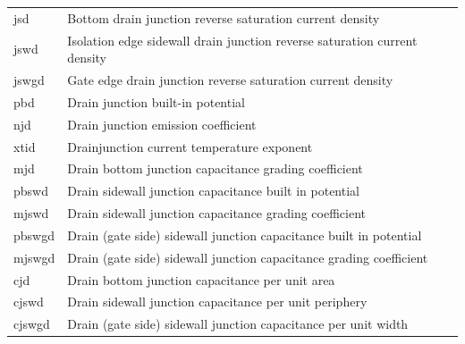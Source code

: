 \begin{longtable}{l l}
{\small jsd} & {\small Bottom drain junction reverse saturation current density} \\
{\small jswd} & {\small Isolation edge sidewall drain junction reverse saturation current density} \\
{\small jswgd} & {\small Gate edge drain junction reverse saturation current density} \\
{\small pbd} & {\small Drain junction built-in potential} \\
{\small njd} & {\small Drain junction emission coefficient} \\
{\small xtid} & {\small Drainjunction current temperature exponent} \\
{\small mjd} & {\small Drain bottom junction capacitance grading coefficient} \\
{\small pbswd} & {\small Drain sidewall junction capacitance built in potential} \\
{\small mjswd} & {\small Drain sidewall junction capacitance grading coefficient} \\
{\small pbswgd} & {\small Drain (gate side) sidewall junction capacitance built in potential} \\
{\small mjswgd} & {\small Drain (gate side) sidewall junction capacitance grading coefficient} \\
{\small cjd} & {\small Drain bottom junction capacitance per unit area} \\
{\small cjswd} & {\small Drain sidewall junction capacitance per unit periphery} \\
{\small cjswgd} & {\small Drain (gate side) sidewall junction capacitance per unit width} \\


\end{longtable}
